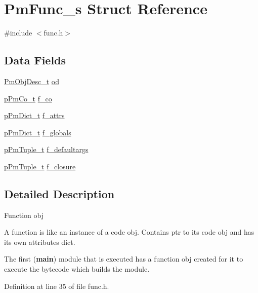\hypertarget{struct_pm_func__s}{\section{Pm\-Func\-\_\-s Struct Reference}
\label{struct_pm_func__s}
}


{\ttfamily \#include $<$func.\-h$>$}

\subsection*{Data Fields}
\begin{DoxyCompactItemize}
\item 
\hyperlink{obj_8h_a72d816790acd8eb550fb25268c2b3489}{Pm\-Obj\-Desc\-\_\-t} \hyperlink{struct_pm_func__s_a31675a6ad3c18e06eb77c12c3d7bb1de}{od}
\item 
\hyperlink{codeobj_8h_a0c4de4c22e1a1557978005cdbb2a351e}{p\-Pm\-Co\-\_\-t} \hyperlink{struct_pm_func__s_ac855d820839ccafcd72e20287e228cca}{f\-\_\-co}
\item 
\hyperlink{dict_8h_a32b81dc9e05f3a84863319301daf749b}{p\-Pm\-Dict\-\_\-t} \hyperlink{struct_pm_func__s_ad750c0d34765082f78e76b61d1c14e6b}{f\-\_\-attrs}
\item 
\hyperlink{dict_8h_a32b81dc9e05f3a84863319301daf749b}{p\-Pm\-Dict\-\_\-t} \hyperlink{struct_pm_func__s_a5c76e923890548c2c21ec754021e7d99}{f\-\_\-globals}
\item 
\hyperlink{tuple_8h_a02fea741eaf15db9ac9f4f9ca0433ee1}{p\-Pm\-Tuple\-\_\-t} \hyperlink{struct_pm_func__s_a503ed74d4cd90a90cb36b18cacf8c908}{f\-\_\-defaultargs}
\item 
\hyperlink{tuple_8h_a02fea741eaf15db9ac9f4f9ca0433ee1}{p\-Pm\-Tuple\-\_\-t} \hyperlink{struct_pm_func__s_ae5f8e8fc29f24733a8c63b049eee979f}{f\-\_\-closure}
\end{DoxyCompactItemize}


\subsection{Detailed Description}
Function obj

A function is like an instance of a code obj. Contains ptr to its code obj and has its own attributes dict.

The first ({\bfseries main}) module that is executed has a function obj created for it to execute the bytecode which builds the module. 

Definition at line 35 of file func.\-h.



